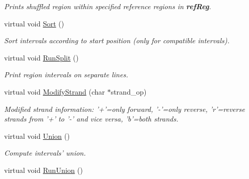 \begin{CompactItemize}
\begin{CompactList}\small\item\em Prints shuffled region within specified reference regions in {\bf refReg}. \item\end{CompactList}\item 
\hypertarget{classGenomicRegion_03959dc5b5695d817b5a40b47f30a4aa}{
virtual void \hyperlink{classGenomicRegion_03959dc5b5695d817b5a40b47f30a4aa}{Sort} ()}
\label{classGenomicRegion_03959dc5b5695d817b5a40b47f30a4aa}

\begin{CompactList}\small\item\em Sort intervals according to start position (only for compatible intervals). \item\end{CompactList}\item 
\hypertarget{classGenomicRegion_1686d4f4d2962b22d506a25a5887c31c}{
virtual void \hyperlink{classGenomicRegion_1686d4f4d2962b22d506a25a5887c31c}{RunSplit} ()}
\label{classGenomicRegion_1686d4f4d2962b22d506a25a5887c31c}

\begin{CompactList}\small\item\em Print region intervals on separate lines. \item\end{CompactList}\item 
\hypertarget{classGenomicRegion_e19cd6eaa883e6517ba12567cd756320}{
virtual void \hyperlink{classGenomicRegion_e19cd6eaa883e6517ba12567cd756320}{ModifyStrand} (char $\ast$strand\_\-op)}
\label{classGenomicRegion_e19cd6eaa883e6517ba12567cd756320}

\begin{CompactList}\small\item\em Modified strand information: '+'=only forward, '-'=only reverse, 'r'=reverse strands from '+' to '-' and vice versa, 'b'=both strands. \item\end{CompactList}\item 
\hypertarget{classGenomicRegion_05cb47d38946b780f7eb585074ccf393}{
virtual void \hyperlink{classGenomicRegion_05cb47d38946b780f7eb585074ccf393}{Union} ()}
\label{classGenomicRegion_05cb47d38946b780f7eb585074ccf393}

\begin{CompactList}\small\item\em Compute intervals' union. \item\end{CompactList}\item 
\hypertarget{classGenomicRegion_3d90c15accabfd5c0279f27f3513ba7c}{
virtual void \hyperlink{classGenomicRegion_3d90c15accabfd5c0279f27f3513ba7c}{RunUnion} ()}
\label{classGenomicRegion_3d90c15accabfd5c0279f27f3513ba7c}


\end{CompactItemize}
